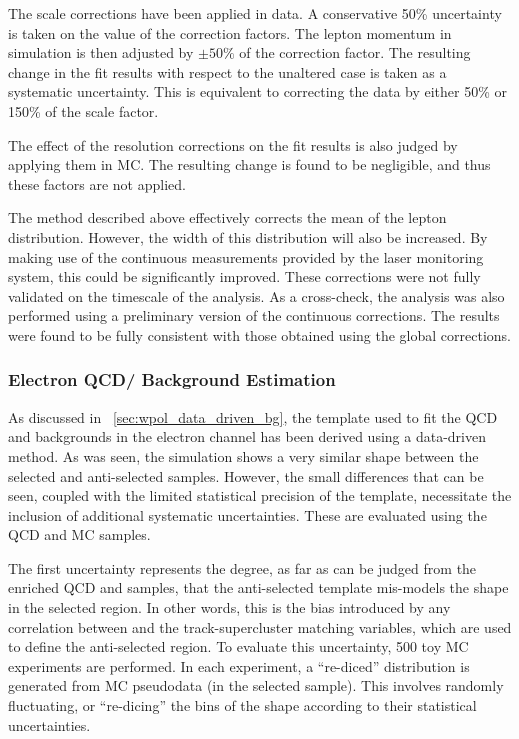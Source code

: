 The scale corrections have been applied in data. A conservative 50\% uncertainty
is taken on the value of the correction factors. The lepton momentum in
simulation is then adjusted by $\pm 50\%$ of the correction factor. The
resulting change in the fit results with respect to the unaltered case is taken
as a systematic uncertainty. This is equivalent to correcting the data by either
50\% or 150\% of the scale factor.

The effect of the resolution corrections on the fit results is also judged by
applying them in \ac{MC}. The resulting change is found to be negligible,
and thus these factors are not applied.

The method described above effectively corrects the mean of the lepton \Pt
distribution. However, the width of this distribution will also be increased. By
making use of the continuous measurements provided by the laser monitoring
system, this could be significantly improved. These corrections were not fully
validated on the timescale of the analysis. As a cross-check, the analysis was
also performed using a preliminary version of the continuous corrections. The
results were found to be fully consistent with those obtained using the global
corrections.

\subsubsection[Electron \ac{QCD}/\gammajets Background Estimation]{Electron \ac{QCD}/\boldmath{\gammajets} Background Estimation}
\label{sec:wpol_syst_ele_bgest}
As discussed in \sec~\ref{sec:wpol_data_driven_bg}, the template used to fit the
\ac{QCD} and \gammajets backgrounds in the electron channel has been derived
using a data-driven method. As was seen, the simulation shows a very similar \LP
shape between the selected and anti-selected samples. However, the small
differences that can be seen, coupled with the limited statistical precision of
the template, necessitate the inclusion of additional systematic
uncertainties. These are evaluated using the \ac{QCD} and \gammajets \ac{MC}
samples.

The first uncertainty represents the degree, as far as can be judged from the
enriched \ac{QCD} and \gammajets samples, that the anti-selected template
mis-models the \LP shape in the selected region. In other words, this is the
bias introduced by any correlation between \LP and the track-supercluster
matching variables, which are used to define the anti-selected region. To
evaluate this uncertainty, 500 toy \ac{MC} experiments are performed. In each
experiment, a ``re-diced'' \LP distribution is generated from \ac{MC} pseudodata
(in the selected sample). This involves randomly fluctuating, or ``re-dicing''
the bins of the \LP shape according to their statistical uncertainties.

